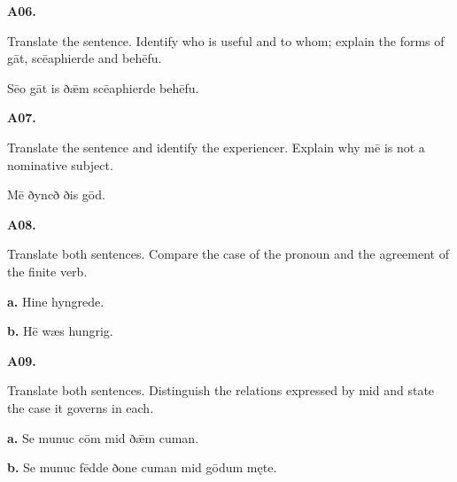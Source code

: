 \par\begin{minipage}{\linewidth}\raggedright
\textbf{A06.}

Translate the sentence. Identify who is useful and to whom; explain the forms of gāt, scēaphierde and behēfu.

Sēo gāt is ðǣm scēaphierde behēfu.

\end{minipage}\par\addvspace{4pt}

\par\begin{minipage}{\linewidth}\raggedright
\textbf{A07.}

Translate the sentence and identify the experiencer. Explain why mē is not a nominative subject.

Mē ðyncð ðis gōd.

\end{minipage}\par\addvspace{4pt}

\par\begin{minipage}{\linewidth}\raggedright
\textbf{A08.}

Translate both sentences. Compare the case of the pronoun and the agreement of the finite verb.

\textbf{a.} Hine hyngrede.

\textbf{b.} Hē wæs hungrig.

\end{minipage}\par\addvspace{4pt}

\par\begin{minipage}{\linewidth}\raggedright
\textbf{A09.}

Translate both sentences. Distinguish the relations expressed by mid and state the case it governs in each.

\textbf{a.} Se munuc cōm mid ðǣm cuman.

\textbf{b.} Se munuc fēdde ðone cuman mid gōdum męte.

\end{minipage}\par\addvspace{4pt}

